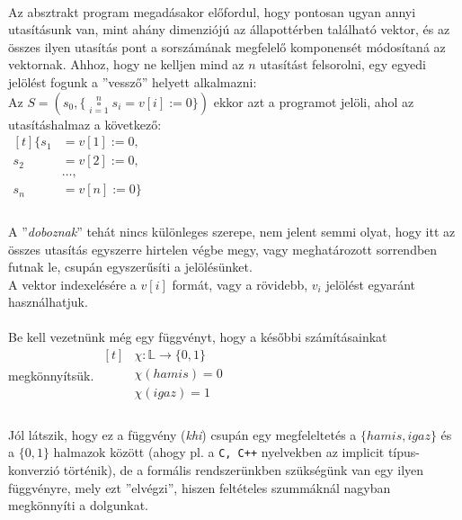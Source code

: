 \documentclass[12pt]{article}
\newcommand{\doboz}[2]{ \ensuremath{\mathop{\square}\limits_{#1=1}^{#2} }  }
\begin{document}
	\paragraph{}
	Az absztrakt program megadásakor előfordul, hogy pontosan ugyan annyi utasításunk van, mint ahány dimenziójú az állapottérben található vektor, és az összes ilyen utasítás pont a sorszámának megfelelő komponensét módosítaná az vektornak. Ahhoz, hogy ne kelljen mind az $n$ utasítást felsorolni, egy egyedi jelölést fogunk a ''vessző'' helyett alkalmazni:\\
	Az $ S = (s_0, \{ \doboz{i}{n} s_i = v[i] := 0  \}) $ ekkor azt a programot jelöli, ahol az utasításhalmaz a következő:\\
	$
	\begin{aligned}[t]
	\{s_1 &= v[1] := 0,\\
	s_2 &= v[2] := 0, \\
	&\dots, \\
	s_n &= v[n] := 0\}\\
	\end{aligned}
	$
	\paragraph{}
	A ''\textit{doboznak}'' tehát nincs különleges szerepe, nem jelent semmi olyat, hogy itt az összes utasítás egyszerre hirtelen végbe megy, vagy meghatározott sorrendben futnak le, csupán egyszerűsíti a jelölésünket.
	\\A vektor indexelésére a $v[i]$ formát, vagy a rövidebb, $v_i$ jelölést egyaránt használhatjuk.
	\paragraph{}Be kell vezetnünk még egy függvényt, hogy a későbbi számításainkat megkönnyítsük.
	$\begin{aligned}[t]
	&\chi: \mathbb{L} \rightarrow \{0, 1\}\\
	&\chi(hamis) = 0\\
	&\chi(igaz) = 1\\
	\end{aligned}
	$
	\paragraph{}
	Jól látszik, hogy ez a függvény (\textit{khi}) csupán egy megfeleltetés a $\{hamis, igaz\}$ és a $\{0, 1\}$ halmazok között (ahogy pl. a \verb|C, C++| nyelvekben az implicit típus-konverzió történik), de a formális rendszerünkben szükségünk van egy ilyen függvényre, mely ezt ''elvégzi'', hiszen feltételes szummáknál nagyban megkönnyíti a dolgunkat.
	
\end{document}

